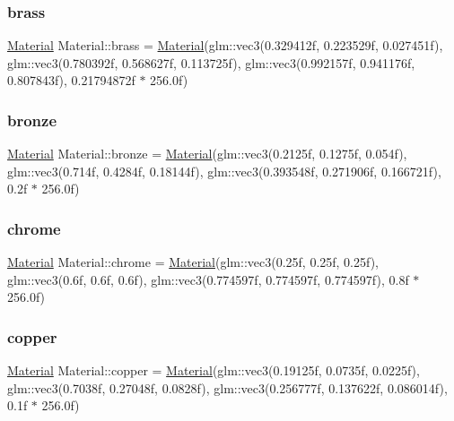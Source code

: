 \subsubsection{\texorpdfstring{brass}{brass}}
{\footnotesize\ttfamily \mbox{\hyperlink{struct_material}{Material}} Material\+::brass = \mbox{\hyperlink{struct_material}{Material}}(glm\+::vec3(0.\+329412f, 0.\+223529f, 0.\+027451f), glm\+::vec3(0.\+780392f, 0.\+568627f, 0.\+113725f), glm\+::vec3(0.\+992157f, 0.\+941176f, 0.\+807843f), 0.\+21794872f $\ast$ 256.\+0f)\hspace{0.3cm}{\ttfamily [static]}}

\mbox{\label{struct_material_ac43b7a8224541fce0de9de18ff4add8c}} 
\subsubsection{\texorpdfstring{bronze}{bronze}}
{\footnotesize\ttfamily \mbox{\hyperlink{struct_material}{Material}} Material\+::bronze = \mbox{\hyperlink{struct_material}{Material}}(glm\+::vec3(0.\+2125f, 0.\+1275f, 0.\+054f), glm\+::vec3(0.\+714f, 0.\+4284f, 0.\+18144f), glm\+::vec3(0.\+393548f, 0.\+271906f, 0.\+166721f), 0.\+2f $\ast$ 256.\+0f)\hspace{0.3cm}{\ttfamily [static]}}

\mbox{\label{struct_material_a49a439730bf4934813e885d6458e496d}} 
\subsubsection{\texorpdfstring{chrome}{chrome}}
{\footnotesize\ttfamily \mbox{\hyperlink{struct_material}{Material}} Material\+::chrome = \mbox{\hyperlink{struct_material}{Material}}(glm\+::vec3(0.\+25f, 0.\+25f, 0.\+25f), glm\+::vec3(0.\+6f, 0.\+6f, 0.\+6f), glm\+::vec3(0.\+774597f, 0.\+774597f, 0.\+774597f), 0.\+8f $\ast$ 256.\+0f)\hspace{0.3cm}{\ttfamily [static]}}

\mbox{\label{struct_material_aad09f525699803a4ed3e7cd6afd3f8a5}} 
\subsubsection{\texorpdfstring{copper}{copper}}
{\footnotesize\ttfamily \mbox{\hyperlink{struct_material}{Material}} Material\+::copper = \mbox{\hyperlink{struct_material}{Material}}(glm\+::vec3(0.\+19125f, 0.\+0735f, 0.\+0225f), glm\+::vec3(0.\+7038f, 0.\+27048f, 0.\+0828f), glm\+::vec3(0.\+256777f, 0.\+137622f, 0.\+086014f), 0.\+1f $\ast$ 256.\+0f)\hspace{0.3cm}{\ttfamily [static]}}

